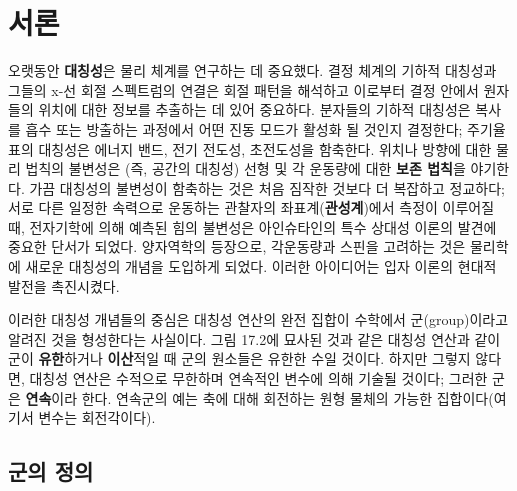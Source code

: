 \section{서론}

오랫동안 \textbf{대칭성}은 물리 체계를 연구하는 데 중요했다. 결정 체계의 기하적 대칭성과 그들의 x-선 회절 스펙트럼의 연결은 회절 패턴을 해석하고 이로부터 결정 안에서 원자들의 위치에 대한 정보를 추출하는 데 있어 중요하다. 분자들의 기하적 대칭성은 복사를 흡수 또는 방출하는 과정에서 어떤 진동 모드가 활성화 될 것인지 결정한다; 주기율표의 대칭성은 에너지 밴드, 전기 전도성, 초전도성을 함축한다. 위치나 방향에 대한 물리 법칙의 불변성은 (즉, 공간의 대칭성) 선형 및 각 운동량에 대한 \textbf{보존 법칙}을 야기한다. 가끔 대칭성의 불변성이 함축하는 것은 처음 짐작한 것보다 더 복잡하고 정교하다; 서로 다른 일정한 속력으로 운동하는 관찰자의 좌표계(\textbf{관성계})에서 측정이 이루어질 때, 전자기학에 의해 예측된 힘의 불변성은 아인슈타인의 특수 상대성 이론의 발견에 중요한 단서가 되었다. 양자역학의 등장으로, 각운동량과 스핀을 고려하는 것은 물리학에 새로운 대칭성의 개념을 도입하게 되었다. 이러한 아이디어는 입자 이론의 현대적 발전을 촉진시켰다.

이러한 대칭성 개념들의 중심은 대칭성 연산의 완전 집합이 수학에서 군(group)이라고 알려진 것을 형성한다는 사실이다. 그림 17.2에 묘사된 것과 같은 대칭성 연산과 같이 군이 \textbf{유한}하거나 \textbf{이산}적일 때 군의 원소들은 유한한 수일 것이다. 하지만 그렇지 않다면, 대칭성 연산은 수적으로 무한하며 연속적인 변수에 의해 기술될 것이다; 그러한 군은 \textbf{연속}이라 한다. 연속군의 예는 축에 대해 회전하는 원형 물체의 가능한 집합이다(여기서 변수는 회전각이다).

\subsection{군의 정의}

